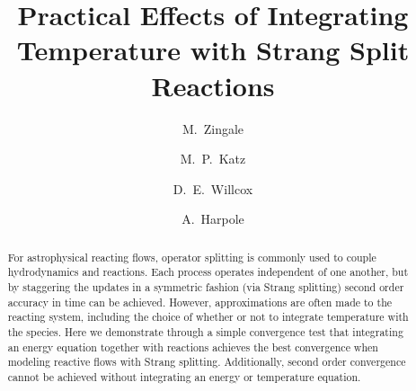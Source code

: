 \documentclass[times,preprint]{aastex631}
\begin{document}
\title{Practical Effects of Integrating Temperature with Strang Split Reactions}



\shortauthors{}

\author[0000-0001-8401-030X]{M.~Zingale}

\author[0000-0003-0439-4556]{M.~P.~Katz}

\author[0000-0003-2300-5165]{D.\ E.\ Willcox}

\author[0000-0002-1530-781X]{A.\ Harpole}



\begin{abstract}
For astrophysical reacting flows, operator splitting is commonly used
to couple hydrodynamics and reactions.  Each process operates
independent of one another, but by staggering the updates in a
symmetric fashion (via Strang splitting) second order accuracy in time
can be achieved.  However, approximations are often made to the
reacting system, including the choice of whether or not to integrate
temperature with the species.  Here we demonstrate through a simple
convergence test that integrating an energy equation together with reactions
achieves the best convergence when modeling reactive flows with Strang
splitting.  Additionally, second order convergence cannot be achieved without integrating an energy or temperature equation.
\end{abstract}


\end{document}
